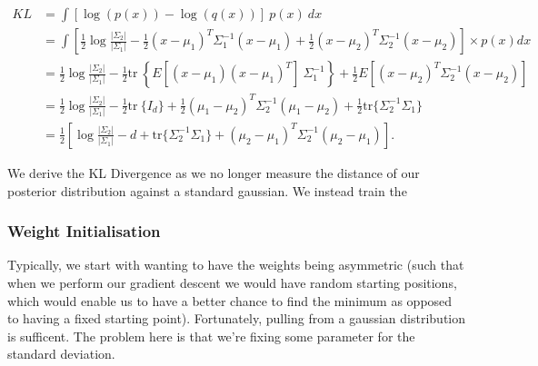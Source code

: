 \documentclass[12pt,twoside]{report}
\begin{document}
\begin{equation}
	\label{eq:t}
	\begin{aligned}
	KL &= \int \left[\log( p(x)) - \log( q(x)) \right]\ p(x)\ dx \\
	&= \int \left[ \frac{1}{2} \log\frac{|\Sigma_2|}{|\Sigma_1|} - \frac{1}{2} (x-\mu_1)^T\Sigma_1^{-1}(x-\mu_1) + \frac{1}{2} (x-\mu_2)^T\Sigma_2^{-1}(x-\mu_2) \right] \times p(x) dx \\
	&= \frac{1}{2} \log\frac{|\Sigma_2|}{|\Sigma_1|} - \frac{1}{2} \text{tr}\ \left\{E[(x - \mu_1)(x - \mu_1)^T] \ \Sigma_1^{-1} \right\} + \frac{1}{2} E[(x - \mu_2)^T \Sigma_2^{-1} (x - \mu_2)] \\
	&= \frac{1}{2} \log\frac{|\Sigma_2|}{|\Sigma_1|} - \frac{1}{2} \text{tr}\ \{I_d \} + \frac{1}{2} (\mu_1 - \mu_2)^T \Sigma_2^{-1} (\mu_1 - \mu_2) + \frac{1}{2} \text{tr} \{ \Sigma_2^{-1} \Sigma_1 \} \\
	&= \frac{1}{2}\left[\log\frac{|\Sigma_2|}{|\Sigma_1|} - d + \text{tr} \{ \Sigma_2^{-1}\Sigma_1 \} + (\mu_2 - \mu_1)^T \Sigma_2^{-1}(\mu_2 - \mu_1)\right].
\end{aligned}
\end{equation}

We derive the KL Divergence as we no longer measure the distance of our posterior distribution against a standard gaussian. We instead train the 



\subsubsection{Weight Initialisation}

Typically, we start with wanting to have the weights being asymmetric (such that when we perform our gradient descent we would have random starting positions, which would enable us to have a better chance to find the minimum as opposed to having a fixed starting point). Fortunately, pulling from a gaussian distribution is sufficent. The problem here is that we're fixing some parameter for the standard deviation. 
\end{document}
